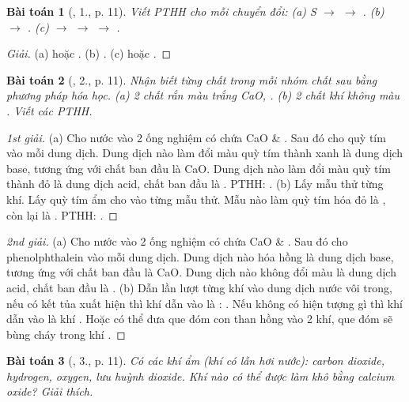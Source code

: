 \documentclass{article}
\newtheorem{baitoan}{Bài toán}
\begin{document}
\begin{baitoan}[\cite{SGK_Hoa_Hoc_9}, 1., p. 11]
	Viết PTHH cho mỗi chuyển đổi: (a) \emph{S $\to$  $\to$ }. (b) \emph{ $\to$ }. (c) \emph{ $\to$  $\to$  $\to$ }.
\end{baitoan}

\begin{proof}[Giải]
	(a)  hoặc . (b) . (c)  hoặc .
\end{proof}

\begin{baitoan}[\cite{SGK_Hoa_Hoc_9}, 2., p. 11]
	Nhận biết từng chất trong mỗi nhóm chất sau bằng phương pháp hóa học. (a) 2 chất rắn màu trắng \emph{CaO, }. (b) 2 chất khí không màu \emph{}. Viết các PTHH.
\end{baitoan}

\begin{proof}[1st giải]
	(a) Cho nước vào 2 ống nghiệm có chứa CaO \& . Sau đó cho quỳ tím vào mỗi dung dịch. Dung dịch nào làm đổi màu quỳ tím thành xanh là dung dịch base, tương ứng với chất ban đầu là CaO. Dung dịch nào làm đổi màu quỳ tím thành đỏ là dung dịch acid, chất ban đầu là . PTHH: . (b) Lấy mẫu thử từng khí. Lấy quỳ tím ẩm cho vào từng mẫu thử. Mẫu nào làm quỳ tím hóa đỏ là , còn lại là . PTHH: .
\end{proof}

\begin{proof}[2nd giải]
	(a) Cho nước vào 2 ống nghiệm có chứa CaO \& . Sau đó cho phenolphthalein vào mỗi dung dịch. Dung dịch nào hóa hồng là dung dịch base, tương ứng với chất ban đầu là CaO. Dung dịch nào không đổi màu là dung dịch acid, chất ban đầu là . (b) Dẫn lần lượt từng khí vào dung dịch nước vôi trong, nếu có kết tủa xuất hiện thì khí dẫn vào là : . Nếu không có hiện tượng gì thì khí dẫn vào là khí . Hoặc có thể đưa que đóm con than hồng vào 2 khí, que đóm sẽ bùng cháy trong khí .
\end{proof}

\begin{baitoan}[\cite{SGK_Hoa_Hoc_9}, 3., p. 11]
	Có các khí ẩm (khí có lẫn hơi nước): carbon dioxide, hydrogen, oxygen, lưu huỳnh dioxide. Khí nào có thể được làm khô bằng calcium oxide? Giải thích.
\end{baitoan}
\end{document}
